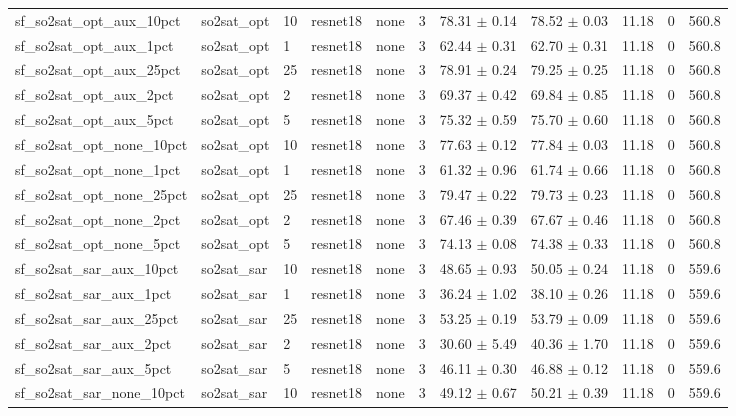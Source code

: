 \begin{tabular}{lllllllllll}
sf_so2sat_opt_aux_10pct & so2sat_opt & 10 & resnet18 & none & 3 & 78.31 $\pm$ 0.14 & 78.52 $\pm$ 0.03 & 11.18 & 0 & 560.8 \\
sf_so2sat_opt_aux_1pct & so2sat_opt & 1 & resnet18 & none & 3 & 62.44 $\pm$ 0.31 & 62.70 $\pm$ 0.31 & 11.18 & 0 & 560.8 \\
sf_so2sat_opt_aux_25pct & so2sat_opt & 25 & resnet18 & none & 3 & 78.91 $\pm$ 0.24 & 79.25 $\pm$ 0.25 & 11.18 & 0 & 560.8 \\
sf_so2sat_opt_aux_2pct & so2sat_opt & 2 & resnet18 & none & 3 & 69.37 $\pm$ 0.42 & 69.84 $\pm$ 0.85 & 11.18 & 0 & 560.8 \\
sf_so2sat_opt_aux_5pct & so2sat_opt & 5 & resnet18 & none & 3 & 75.32 $\pm$ 0.59 & 75.70 $\pm$ 0.60 & 11.18 & 0 & 560.8 \\
sf_so2sat_opt_none_10pct & so2sat_opt & 10 & resnet18 & none & 3 & 77.63 $\pm$ 0.12 & 77.84 $\pm$ 0.03 & 11.18 & 0 & 560.8 \\
sf_so2sat_opt_none_1pct & so2sat_opt & 1 & resnet18 & none & 3 & 61.32 $\pm$ 0.96 & 61.74 $\pm$ 0.66 & 11.18 & 0 & 560.8 \\
sf_so2sat_opt_none_25pct & so2sat_opt & 25 & resnet18 & none & 3 & 79.47 $\pm$ 0.22 & 79.73 $\pm$ 0.23 & 11.18 & 0 & 560.8 \\
sf_so2sat_opt_none_2pct & so2sat_opt & 2 & resnet18 & none & 3 & 67.46 $\pm$ 0.39 & 67.67 $\pm$ 0.46 & 11.18 & 0 & 560.8 \\
sf_so2sat_opt_none_5pct & so2sat_opt & 5 & resnet18 & none & 3 & 74.13 $\pm$ 0.08 & 74.38 $\pm$ 0.33 & 11.18 & 0 & 560.8 \\
sf_so2sat_sar_aux_10pct & so2sat_sar & 10 & resnet18 & none & 3 & 48.65 $\pm$ 0.93 & 50.05 $\pm$ 0.24 & 11.18 & 0 & 559.6 \\
sf_so2sat_sar_aux_1pct & so2sat_sar & 1 & resnet18 & none & 3 & 36.24 $\pm$ 1.02 & 38.10 $\pm$ 0.26 & 11.18 & 0 & 559.6 \\
sf_so2sat_sar_aux_25pct & so2sat_sar & 25 & resnet18 & none & 3 & 53.25 $\pm$ 0.19 & 53.79 $\pm$ 0.09 & 11.18 & 0 & 559.6 \\
sf_so2sat_sar_aux_2pct & so2sat_sar & 2 & resnet18 & none & 3 & 30.60 $\pm$ 5.49 & 40.36 $\pm$ 1.70 & 11.18 & 0 & 559.6 \\
sf_so2sat_sar_aux_5pct & so2sat_sar & 5 & resnet18 & none & 3 & 46.11 $\pm$ 0.30 & 46.88 $\pm$ 0.12 & 11.18 & 0 & 559.6 \\
sf_so2sat_sar_none_10pct & so2sat_sar & 10 & resnet18 & none & 3 & 49.12 $\pm$ 0.67 & 50.21 $\pm$ 0.39 & 11.18 & 0 & 559.6 \\

\end{tabular}
